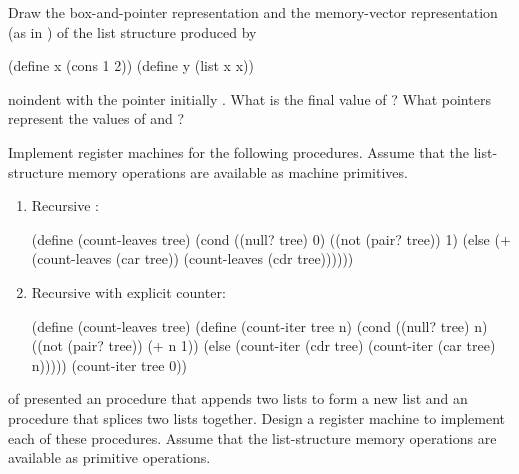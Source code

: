 \begin{exercise}
	\label{Exercise 5.20}
	Draw the box-and-pointer representation and the memory-vector representation (as in ) of the list structure produced by
	\begin{scheme}
	  (define x (cons 1 2))
	  (define y (list x x))
	\end{scheme}
	noindent
	with the  pointer initially .
	What is the final value of  ?
	What pointers represent the values of  and  ?
\end{exercise}



\begin{exercise}
	\label{Exercise 5.21}
	Implement register machines for the following procedures.
	Assume that the list-structure memory operations are available as machine primitives.
	\begin{enumerate}[label = \alph*., leftmargin = *]

		\item
			Recursive :
			\begin{scheme}
			  (define (count-leaves tree)
			    (cond ((null? tree) 0)
			          ((not (pair? tree)) 1)
			          (else (+ (count-leaves (car tree))
			                   (count-leaves (cdr tree))))))
			\end{scheme}

		\item
			Recursive  with explicit counter:
			\begin{scheme}
			  (define (count-leaves tree)
			    (define (count-iter tree n)
			      (cond ((null? tree) n)
			            ((not (pair? tree)) (+ n 1))
			            (else
			             (count-iter (cdr tree)
			                         (count-iter (car tree)
			                                     n)))))
			    (count-iter tree 0))
			\end{scheme}

	\end{enumerate}
\end{exercise}



\begin{exercise}
	\label{Exercise 5.22}
	 of  presented an  procedure that appends two lists to form a new list and an  procedure that splices two lists together.
	Design a register machine to implement each of these procedures.
	Assume that the list-structure memory operations are available as primitive operations.
\end{exercise}
